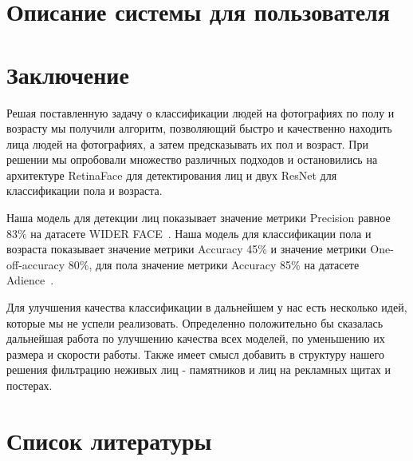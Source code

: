 \documentclass[a4paper,14pt]{extarticle}
\begin{document}
    \section{Описание системы для пользователя}\label{sec:описание-системы-для-пользователя}
    
    \newpage


    \section{Заключение}\label{sec:выводы}
    Решая поставленную задачу о классификации людей на фотографиях по полу и возрасту мы получили алгоритм,
    позволяющий быстро и качественно находить лица людей на фотографиях, а затем предсказывать их пол и возраст.
    При решении мы опробовали множество различных подходов и остановились на архитектуре RetinaFace для детектирования лиц
    и двух ResNet для классификации пола и возраста.
    \par Наша модель для детекции лиц показывает значение метрики Precision равное 83\% на датасете WIDER FACE~\cite{wider}.
    Наша модель для классификации пола и возраста показывает значение метрики Accuracy 45\% и
    значение метрики One-off-accuracy 80\%, для пола значение метрики Accuracy 85\% на датасете Adience~\cite{adience}.
    \par Для улучшения качества классификации в дальнейшем у нас есть несколько идей, которые мы не успели реализовать.
    Определенно положительно бы сказалась дальнейшая работа по улучшению качества всех моделей, по уменьшению их размера и скорости работы.
    Также имеет смысл добавить в структуру нашего решения фильтрацию неживых лиц - памятников и лиц на рекламных щитах и постерах.
    \newpage


    \section{Список литературы}\label{sec:список-литературы}
    
\end{document}
